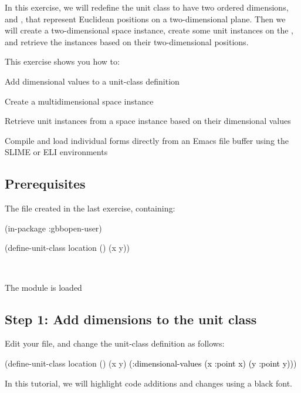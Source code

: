 \documentclass[10pt,twoside,english,pdftex]{article}
\begin{document}
In this exercise, we will redefine the  unit class to
have two ordered dimensions,  and , that represent Euclidean
positions on a two-dimensional plane.  Then we will create a two-dimensional
 space instance, create some 
unit instances on the , and retrieve the instances
based on their two-dimensional positions.

\fndocrule

This exercise shows you how to:
\begin{tightitemize}
\item Add dimensional values to a unit-class definition
\item Create a multidimensional space instance
\item Retrieve unit instances from a space instance based on their
  dimensional values
\item Compile and load individual forms directly from an Emacs file
  buffer using the SLIME or ELI environments
\end{tightitemize}

\fndocrule

\subsection*{Prerequisites}

\begin{tightitemize}
\item The  file created in the last
  exercise, containing:
%
\W\supp\notpretop
\begin{example}
\textcolor{darkergray}{%
  (in-package :gbbopen-user)

  (define-unit-class location ()
    (x y))}
\end{example}
\W\\

\item The  module is loaded
\end{tightitemize}

\subsection*{Step 1: Add dimensions to the  unit class}

Edit your  file, and change the
 unit-class definition as follows:
%
\W\supp
\begin{example}
\textcolor{darkergray}{%
  (define-unit-class location ()
    (x y)
    \textcolor{black}{(:dimensional-values
      (x :point x)
      (y :point y))})}
\end{example}
%
In this tutorial, we will highlight code additions and changes using a
black font.
\end{document}
